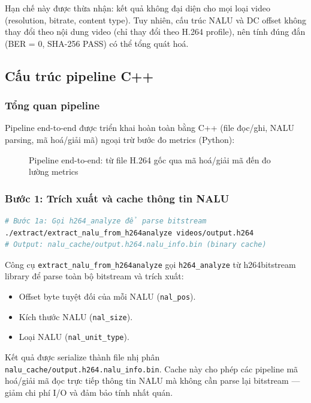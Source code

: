 Hạn chế này được thừa nhận: kết quả không đại diện cho mọi loại video (resolution,
bitrate, content type). Tuy nhiên, cấu trúc NALU và DC offset không thay đổi theo
nội dung video (chỉ thay đổi theo H.264 profile), nên tính đúng đắn
(BER = 0, SHA-256 PASS) có thể tổng quát hoá.

\subsection{Cấu trúc pipeline C++}

\subsubsection{Tổng quan pipeline}

Pipeline end-to-end được triển khai hoàn toàn bằng C++ (file đọc/ghi, NALU parsing,
mã hoá/giải mã) ngoại trừ bước đo metrics (Python):

\begin{figure}[ht]
\centering

\caption{Pipeline end-to-end: từ file H.264 gốc qua mã hoá/giải mã đến đo lường metrics}
\label{fig:pipeline}
\end{figure}

\subsubsection{Bước 1: Trích xuất và cache thông tin NALU}

\begin{lstlisting}[language=bash, caption={Trích xuất NALU offsets và types bằng h264\_analyze}]
# Bước 1a: Gọi h264_analyze để parse bitstream
./extract/extract_nalu_from_h264analyze videos/output.h264
# Output: nalu_cache/output.h264.nalu_info.bin (binary cache)
\end{lstlisting}

Công cụ \texttt{extract\_nalu\_from\_h264analyze} gọi \texttt{h264\_analyze} từ
h264bitstream library để parse toàn bộ bitstream và trích xuất:
\begin{itemize}
  \item Offset byte tuyệt đối của mỗi NALU (\texttt{nal\_pos}).
  \item Kích thước NALU (\texttt{nal\_size}).
  \item Loại NALU (\texttt{nal\_unit\_type}).
\end{itemize}

Kết quả được serialize thành file nhị phân \texttt{nalu\_cache/output.h264.nalu\_info.bin}.
Cache này cho phép các pipeline mã hoá/giải mã đọc trực tiếp thông tin NALU
mà không cần parse lại bitstream --- giảm chi phí I/O và đảm bảo tính nhất quán.

